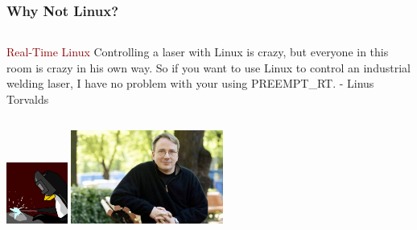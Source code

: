 \documentclass{beamer}
\begin{document}
\begin{frame}
	\frametitle{Why Not Linux?}
	\begin{columns}[c]
		\begin{column}{12cm}
			\vspace{1cm}
			\begin{block}{
				\centering\textcolor{darkred}{Real-Time Linux}}
				\justifying
				Controlling a laser with Linux is crazy, but everyone in this room is crazy
				in his own way. So if you want to use Linux to control an industrial welding
				laser, I have no problem with your using PREEMPT\_RT.
				\vspace{.2cm}
				\hspace*{9.5cm}\footnotesize{- Linus Torvalds}
			\end{block}
		\end{column}
	\end{columns}
	\vspace{.5cm}
	\hspace*{.5cm}
	\includegraphics[width=2cm]{figs/preempt-rt.png}
	\hspace*{3cm}
	\includegraphics[width=5cm]{figs/linus-torvalds.jpg}
\end{frame}
\end{document}
